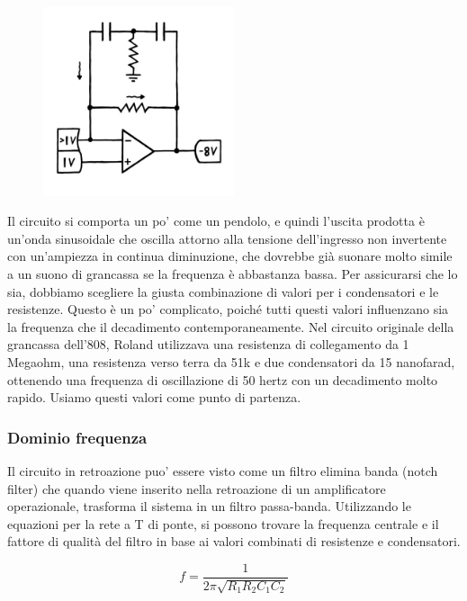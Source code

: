 \documentclass{article}
\theoremstyle{definition}
\begin{document}
\begin{figure}[ht]
    \centering
    \includegraphics[width=0.5\textwidth]{Toscillator4.png} 
    \label{fig:Toscillator4}
\end{figure}

Il circuito si comporta un po' come un pendolo, e quindi l'uscita prodotta è un'onda sinusoidale che oscilla attorno alla tensione dell'ingresso non invertente con un'ampiezza in continua diminuzione, che dovrebbe già suonare molto simile a un suono di grancassa se la frequenza è abbastanza bassa.
Per assicurarsi che lo sia, dobbiamo scegliere la giusta combinazione di valori per i condensatori e le resistenze.
Questo è un po' complicato, poiché tutti questi valori influenzano sia la frequenza che il decadimento contemporaneamente.
Nel circuito originale della grancassa dell'808, Roland utilizzava una resistenza di collegamento da 1 Megaohm, una resistenza verso terra da 51k e due condensatori da 15 nanofarad, ottenendo una frequenza di oscillazione di 50 hertz con un decadimento molto rapido.
Usiamo questi valori come punto di partenza. 

\subsubsection{Dominio frequenza}

Il circuito in retroazione puo' essere visto come un filtro elimina banda  (notch filter) 
che quando viene inserito nella retroazione di un amplificatore operazionale, trasforma il sistema in un filtro passa-banda. Utilizzando le equazioni per la rete a T di ponte, si possono trovare la frequenza centrale e il fattore di qualità del filtro in base ai valori combinati di resistenze e condensatori.

\begin{equation}
    f = \frac{1}{2 \pi\sqrt{R_1 R_2 C_1 C_2}}
\end{equation}
\end{document}
